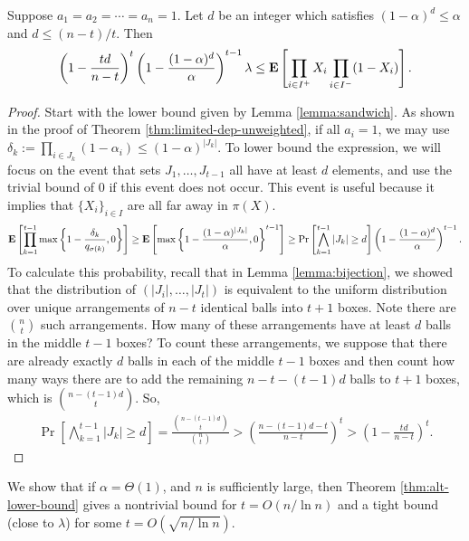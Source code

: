 \begin{theorem}\label{thm:alt-lower-bound}
Suppose $a_1=a_2=\cdots=a_n=1$. Let $d$ be an integer which satisfies $(1-\alpha)^d\le \alpha$ and $d\le (n-t)/t$. Then
\[ \left(1-\frac{td}{n-t}\right)^t \left(1 - \frac{ (1-\alpha)^d}{\alpha}\right)^{t-1} \lambda \le \text{\bf E}\left[\prod_{i\in I^+} X_i \prod_{i \in I^-}(1-X_i) \right]. \]
\end{theorem}
\begin{proof}
Start with the lower bound given by Lemma \ref{lemma:sandwich}. As shown in the proof of Theorem \ref{thm:limited-dep-unweighted}, if all $a_i=1$, we may use $\delta_k:= \prod_{i\in J_k}(1-\alpha_i)\le (1-\alpha)^{|J_k|}$. To lower bound the expression, we will focus on the event that sets $J_1,\ldots,J_{t-1}$ all have at least $d$ elements, and use the trivial bound of 0 if this event does not occur. This event is useful because it implies that $\{X_i\}_{i\in I}$ are all far away in $\pi(X)$.
\begin{align*}
\text{\bf E}\left[\prod_{k=1}^{t-1} \max\left\{1 - \frac{\delta_k}{q_{\sigma(k)}},0\right\} \right]
\ge \text{\bf E}\left[\max\left\{1 - \frac{ (1-\alpha)^{|J_k|}}{\alpha},0\right\}^{t-1} \right]
\ge \Pr\left[\bigwedge_{k=1}^{t-1} |J_k|\ge d\right] 
\left(1 - \frac{ (1-\alpha)^d}{\alpha}\right)^{t-1}.
\end{align*}
To calculate this probability, recall that in Lemma \ref{lemma:bijection}, we showed that the distribution of $(|J_i|,\ldots,|J_t|)$ is equivalent to the uniform distribution over unique arrangements of $n-t$ identical balls into $t+1$ boxes. Note there are $\binom{n}{t}$ such arrangements. How many of these arrangements have at least $d$ balls in the middle $t-1$ boxes? To count these arrangements, we suppose that there are already exactly $d$ balls in each of the middle $t-1$ boxes and then count how many ways there are to add the remaining $n-t-(t-1)d$ balls to $t+1$ boxes, which is $\binom{n-(t-1)d}{t}$. So,
\begin{align*}
\Pr\left[\bigwedge_{k=1}^{t-1} |J_k|\ge d\right] 
= \frac{\binom{n-(t-1)d}{t}}{\binom{n}{t}}
> \left(\frac{n-(t-1)d-t}{n-t}\right)^t
> \left(1-\frac{td}{n-t}\right)^t.
\end{align*}
\end{proof}

We show that if $\alpha=\Theta(1)$, and $n$ is sufficiently large, then Theorem \ref{thm:alt-lower-bound} gives a nontrivial bound for $t=O(n/\ln n)$ and a tight bound (close to $\lambda$) for some $t=O(\sqrt{n/\ln n})$.

